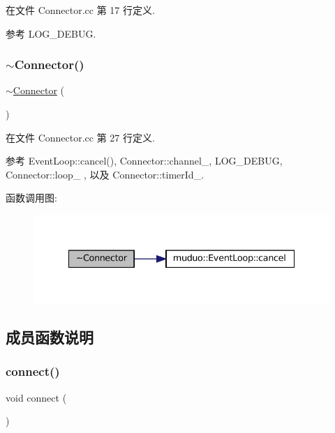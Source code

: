 在文件 Connector.\+cc 第 17 行定义.



参考 L\+O\+G\+\_\+\+D\+E\+B\+UG.

\mbox{\label{classmuduo_1_1Connector_a3ee3948f23cf15142798ae0031f6b692}} 
\subsubsection{\texorpdfstring{$\sim$\+Connector()}{~Connector()}}
{\footnotesize\ttfamily $\sim$\hyperlink{classmuduo_1_1Connector}{Connector} (\begin{DoxyParamCaption}{ }\end{DoxyParamCaption})}



在文件 Connector.\+cc 第 27 行定义.



参考 Event\+Loop\+::cancel(), Connector\+::channel\+\_\+, L\+O\+G\+\_\+\+D\+E\+B\+UG, Connector\+::loop\+\_\+ , 以及 Connector\+::timer\+Id\+\_\+.

函数调用图\+:
\nopagebreak
\begin{figure}[H]
\begin{center}
\leavevmode
\includegraphics[width=335pt]{classmuduo_1_1Connector_a3ee3948f23cf15142798ae0031f6b692_cgraph}
\end{center}
\end{figure}


\subsection{成员函数说明}
\mbox{\label{classmuduo_1_1Connector_a1396bf9b5defe9fa844a63b5cd40ac0e}} 
\subsubsection{\texorpdfstring{connect()}{connect()}}
{\footnotesize\ttfamily void connect (\begin{DoxyParamCaption}{ }\end{DoxyParamCaption})\hspace{0.3cm}{\ttfamily [private]}}



